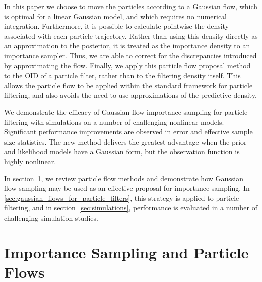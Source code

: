 \documentclass{article}
\begin{document}
In this paper we choose to move the particles according to a Gaussian flow, which is optimal for a linear Gaussian model, and which requires no numerical integration. Furthermore, it is possible to calculate pointwise the density associated with each particle trajectory. Rather than using this density directly as an approximation to the posterior, it is treated as the importance density to an importance sampler. Thus, we are able to correct for the discrepancies introduced by approximating the flow. Finally, we apply this particle flow proposal method to the OID of a particle filter, rather than to the filtering density itself. This allows the particle flow to be applied within the standard framework for particle filtering, and also avoids the need to use approximations of the predictive density.

We demonstrate the efficacy of Gaussian flow importance sampling for particle filtering with simulations on a number of challenging nonlinear models. Significant performance improvements are observed in error and effective sample size statistics. The new method delivers the greatest advantage when the prior and likelihood models have a Gaussian form, but the observation function is highly nonlinear.

In section~\ref{sec:gaussian_flows}, we review particle flow methods and demonstrate how Gaussian flow sampling may be used as an effective proposal for importance sampling. In \ref{sec:gaussian_flows_for_particle_filters}, this strategy is applied to particle filtering, and in section~\ref{sec:simulations}, performance is evaluated in a number of challenging simulation studies.


\section{Importance Sampling and Particle Flows} \label{sec:gaussian_flows}
\end{document}
